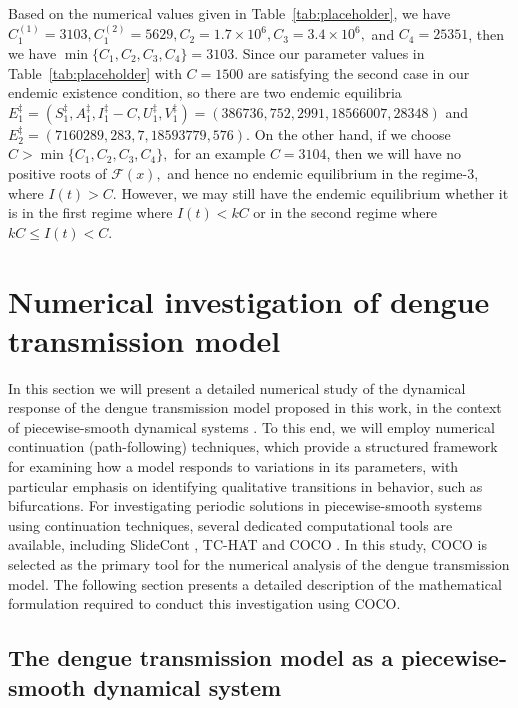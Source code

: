 \documentclass[preprint]{elsarticle}
\begin{document}
Based on the numerical values given in Table~\ref{tab:placeholder}, we have $C_1^{(1)}=3103, C_1^{(2)}=5629, C_2=1.7\times 10^6, C_3=3.4\times10^6,$ and $C_4=25351$, then we have $\min\{C_1,C_2,C_3,C_4\} = 3103.$ Since our parameter values in Table~\ref{tab:placeholder} with $C=1500$ are satisfying the second case in our endemic existence condition, so there are two endemic equilibria $ E^\ddagger_1 = \left( S_1^\ddagger, A_1^\ddagger, I_1^\ddagger-C, U_1^\ddagger, V_1^\ddagger\right)
    = \left(386736, 752, 2991, 18566007, 28348 \right)$ and $E^\ddagger_2  = \left(7160289, 283, 7, 18593779, 576 \right)$.
On the other hand, if we choose $C>\min\{C_1,C_2,C_3,C_4\},$ for an example $C=3104$, then we will have no positive roots of $\mathcal{F}(x),$ and hence no endemic equilibrium in the regime-3, where $I(t)>C$. However, we may still have the endemic equilibrium whether it is in the first regime where $I(t)< kC$ or in the second regime where $kC\leq I(t)<C$.







\section{Numerical investigation of dengue transmission model}\label{Sec4}

In this section we will present a detailed numerical study of the dynamical response of the dengue transmission model proposed in this work, in the context of piecewise-smooth dynamical systems \cite{librochamp}. To this end, we will employ numerical continuation (path-following) techniques, which provide a structured framework for examining how a model responds to variations in its parameters, with particular emphasis on identifying qualitative transitions in behavior, such as bifurcations. For investigating periodic solutions in piecewise-smooth systems using continuation techniques, several dedicated computational tools are available, including SlideCont \cite{slidecont}, TC-HAT \cite{tchat} and COCO \cite{dankowicz2013}. In this study, COCO is selected as the primary tool for the numerical analysis of the dengue transmission model. The following section presents a detailed description of the mathematical formulation required to conduct this investigation using COCO.

\subsection{The dengue transmission model as a piecewise-smooth dynamical system}
\end{document}
